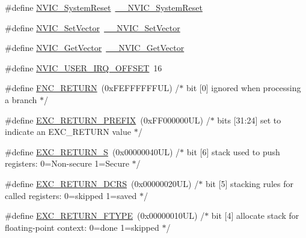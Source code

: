 \begin{DoxyCompactItemize}
\#define \hyperlink{group___c_m_s_i_s___core___n_v_i_c_functions_ga6aa0367d3642575610476bf0366f0c48}{N\+V\+I\+C\+\_\+\+System\+Reset}~\hyperlink{group___c_m_s_i_s___core___n_v_i_c_functions_ga0d9aa2d30fa54b41eb780c16e35b676c}{\+\_\+\+\_\+\+N\+V\+I\+C\+\_\+\+System\+Reset}
\item 
\#define \hyperlink{group___c_m_s_i_s___core___n_v_i_c_functions_ga804af63bb4c4c317387897431814775d}{N\+V\+I\+C\+\_\+\+Set\+Vector}~\hyperlink{group___c_m_s_i_s___core___n_v_i_c_functions_ga0df355460bc1783d58f9d72ee4884208}{\+\_\+\+\_\+\+N\+V\+I\+C\+\_\+\+Set\+Vector}
\item 
\#define \hyperlink{group___c_m_s_i_s___core___n_v_i_c_functions_ga955eb1c33a3dcc62af11a8385e8c0fc8}{N\+V\+I\+C\+\_\+\+Get\+Vector}~\hyperlink{group___c_m_s_i_s___core___n_v_i_c_functions_ga44b665d2afb708121d9b10c76ff00ee5}{\+\_\+\+\_\+\+N\+V\+I\+C\+\_\+\+Get\+Vector}
\item 
\#define \hyperlink{group___c_m_s_i_s___core___n_v_i_c_functions_ga8045d905a5ca57437d8e6f71ffcb6df5}{N\+V\+I\+C\+\_\+\+U\+S\+E\+R\+\_\+\+I\+R\+Q\+\_\+\+O\+F\+F\+S\+ET}~16
\item 
\#define \hyperlink{group___c_m_s_i_s___core___n_v_i_c_functions_gabaa62910bf89acc186ae998c611e64ab}{F\+N\+C\+\_\+\+R\+E\+T\+U\+RN}~(0x\+F\+E\+F\+F\+F\+F\+F\+F\+U\+L)     /$\ast$ bit \mbox{[}0\mbox{]} ignored when processing a branch                             $\ast$/
\item 
\#define \hyperlink{group___c_m_s_i_s___core___n_v_i_c_functions_ga99e0c1c19f050880a8bd827a7f420bec}{E\+X\+C\+\_\+\+R\+E\+T\+U\+R\+N\+\_\+\+P\+R\+E\+F\+IX}~(0x\+F\+F000000\+U\+L)     /$\ast$ bits \mbox{[}31\+:24\mbox{]} set to indicate an E\+X\+C\+\_\+\+R\+E\+T\+U\+R\+N value                     $\ast$/
\item 
\#define \hyperlink{group___c_m_s_i_s___core___n_v_i_c_functions_ga88711355d0196b1ffeb18c33e2c95360}{E\+X\+C\+\_\+\+R\+E\+T\+U\+R\+N\+\_\+S}~(0x00000040\+U\+L)     /$\ast$ bit \mbox{[}6\mbox{]} stack used to push registers\+: 0=\+Non-\/secure 1=\+Secure          $\ast$/
\item 
\#define \hyperlink{group___c_m_s_i_s___core___n_v_i_c_functions_ga0a0f2c03b4aef2c02bdae044bda1324b}{E\+X\+C\+\_\+\+R\+E\+T\+U\+R\+N\+\_\+\+D\+C\+RS}~(0x00000020\+U\+L)     /$\ast$ bit \mbox{[}5\mbox{]} stacking rules for called registers\+: 0=skipped 1=saved       $\ast$/
\item 
\#define \hyperlink{group___c_m_s_i_s___core___n_v_i_c_functions_ga342b51c3eec59822bf206e24ef881a9e}{E\+X\+C\+\_\+\+R\+E\+T\+U\+R\+N\+\_\+\+F\+T\+Y\+PE}~(0x00000010\+U\+L)     /$\ast$ bit \mbox{[}4\mbox{]} allocate stack for floating-\/point context\+: 0=done 1=skipped  $\ast$/

\end{DoxyCompactItemize}
